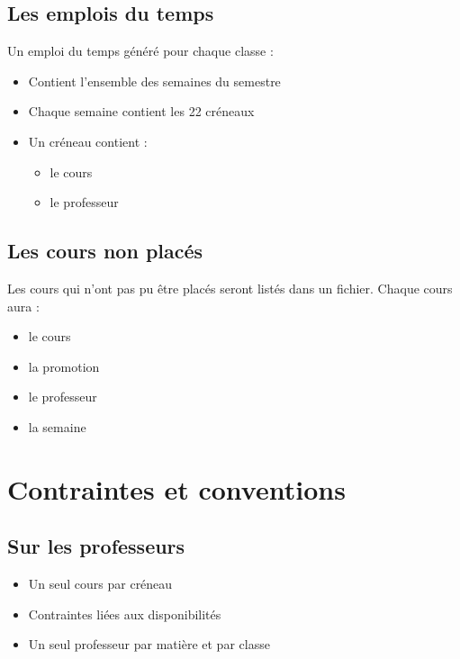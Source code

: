 \documentclass{beamer}
\begin{document}
\subsection{Les emplois du temps}
\begin {frame}
Un emploi du temps généré pour chaque classe : \\
\begin{itemize}
\item Contient l'ensemble des semaines du semestre
\item Chaque semaine contient les 22 créneaux
\item Un créneau contient : 
\begin {itemize}
\item le cours
\item le professeur
\end{itemize}
\end{itemize}
\end{frame}

\subsection{Les cours non placés}
\begin{frame}
Les cours qui n'ont pas pu être placés seront listés dans un fichier.
Chaque cours aura : 
\begin{itemize}
\item le cours
\item la promotion
\item le professeur
\item la semaine
\end{itemize}
\end{frame}



\section{Contraintes et conventions}

\subsection{Sur les professeurs}
\begin{frame}
\begin{itemize}
\item Un seul cours par créneau
\item Contraintes liées aux disponibilités
\item Un seul professeur par matière et par classe
\end{itemize}
\end{frame}
\end{document}
